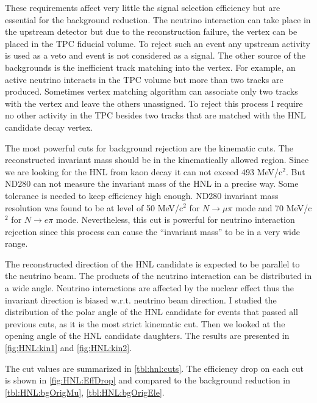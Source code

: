 \documentclass[../main.tex]{subfiles}
\begin{document}
These requirements affect very little the signal selection efficiency but are essential for the background reduction. The neutrino interaction can take place in the upstream detector but due to the reconstruction failure, the vertex can be placed in the TPC fiducial volume. To reject such an event any upstream activity is used as a veto and event is not considered as a signal. The other source of the backgrounds is the inefficient track matching into the vertex. For example, an active neutrino interacts in the TPC volume but more than two tracks are produced. Sometimes vertex matching algorithm can associate only two tracks with the vertex and leave the others unassigned. To reject this process I require no other activity in the TPC besides two tracks that are matched with the HNL candidate decay vertex.

The most powerful cuts for background rejection are the kinematic cuts. The reconstructed invariant mass should be in the kinematically allowed region. Since we are looking for the HNL from kaon decay it can not exceed 493 MeV/$\text{c}^2$. But ND280 can not measure the invariant mass of the HNL in a precise way. Some tolerance is needed to keep efficiency high enough. ND280 invariant mass resolution was found to be at level of 50 MeV/c${}^2$ for $N\to\mu\pi$ mode and 70 MeV/c${}^2$ for $N\to e\pi$ mode. Nevertheless, this cut is powerful for neutrino interaction rejection since this process can cause the ``invariant mass'' to be in a very wide range.

The reconstructed direction of the HNL candidate is expected to be parallel to the neutrino beam. The products of the neutrino interaction can be distributed in a wide angle. Neutrino interactions are affected by the nuclear effect thus the invariant direction is biased w.r.t. neutrino beam direction. I studied the distribution of the polar angle of the HNL candidate for events that passed all previous cuts, as it is the most strict kinematic cut. Then we looked at the opening angle of the HNL candidate daughters. The results are presented in \autoref{fig:HNL:kin1} and \autoref{fig:HNL:kin2}.

The cut values are summarized in \autoref{tbl:hnl:cuts}. The efficiency drop on each cut is shown in \autoref{fig:HNL:EffDrop} and compared to the background reduction in \autoref{tbl:HNL:bgOrigMu}, \autoref{tbl:HNL:bgOrigEle}.
\end{document}
